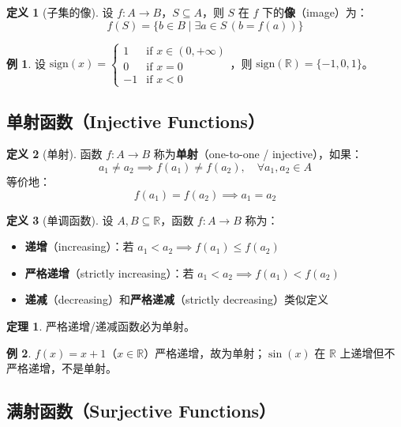 \documentclass[UTF8,11pt,a4paper]{ctexbook}   %
\theoremstyle{definition}
\newtheorem{definition}{定义}[section]
\newtheorem{theorem}{定理}[section]
\newtheorem{example}{例}[section]
\begin{document}
\begin{definition}[子集的像]
设 $f: A \to B$，$S \subseteq A$，则 $S$ 在 $f$ 下的\textbf{像}（image）为：
\[
f(S) = \{b \in B \mid \exists a \in S\,(b = f(a))\}
\]
\end{definition}

\begin{example}
设 $\mathrm{sign}(x) = \begin{cases} 1 & \text{if } x \in (0, +\infty) \\ 0 & \text{if } x = 0 \\ -1 & \text{if } x < 0 \end{cases}$，则 $\mathrm{sign}(\mathbb{R}) = \{-1, 0, 1\}$。
\end{example}

\subsection{单射函数（Injective Functions）}

\begin{definition}[单射]
函数 $f: A \to B$ 称为\textbf{单射}（one-to-one / injective），如果：
\[
a_1 \neq a_2 \implies f(a_1) \neq f(a_2), \quad \forall a_1, a_2 \in A
\]
等价地：
\[
f(a_1) = f(a_2) \implies a_1 = a_2
\]
\end{definition}

\begin{definition}[单调函数]
设 $A, B \subseteq \mathbb{R}$，函数 $f: A \to B$ 称为：
\begin{itemize}
    \item \textbf{递增}（increasing）：若 $a_1 < a_2 \implies f(a_1) \leq f(a_2)$
    \item \textbf{严格递增}（strictly increasing）：若 $a_1 < a_2 \implies f(a_1) < f(a_2)$
    \item \textbf{递减}（decreasing）和\textbf{严格递减}（strictly decreasing）类似定义
\end{itemize}
\end{definition}

\begin{theorem}
严格递增/递减函数必为单射。
\end{theorem}

\begin{example}
$f(x) = x + 1$（$x \in \mathbb{R}$）严格递增，故为单射；$\sin(x)$ 在 $\mathbb{R}$ 上递增但不严格递增，不是单射。
\end{example}

\subsection{满射函数（Surjective Functions）}
\end{document}

